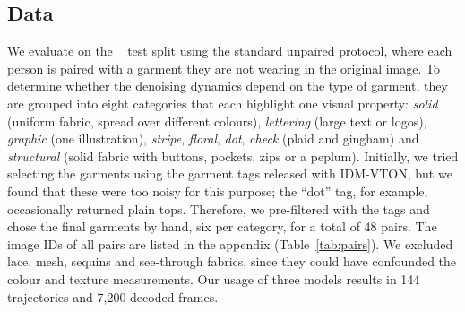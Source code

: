 \begin{table}[h]
\caption{Standard scores on the full \vitonhd test split as reported by \catvton~\cite{chong2025catvton} (Table 1 there; \catvton is its mask-based version, the checkpoint used in this paper). KID as reported. These scores come from the original inference settings of each model, not from our DDIM runs.}
\label{tab:benchmark}
\centering
\small
\setlength{\tabcolsep}{3pt}
\end{table}

\subsection{Data}
We evaluate on the \vitonhd~\cite{choi2021vitonhd} test split using the standard unpaired protocol, where each person is paired with a garment they are not wearing in the original image. To determine whether the denoising dynamics depend on the type of garment, they are grouped into eight categories that each highlight one visual property: \emph{solid} (uniform fabric, spread over different colours), \emph{lettering} (large text or logos), \emph{graphic} (one illustration), \emph{stripe}, \emph{floral}, \emph{dot}, \emph{check} (plaid and gingham) and \emph{structural} (solid fabric with buttons, pockets, zips or a peplum). Initially, we tried selecting the garments using the garment tags released with IDM-VTON, but we found that these were too noisy for this purpose; the ``dot'' tag, for example, occasionally returned plain tops. Therefore, we pre-filtered with the tags and chose the final garments by hand, six per category, for a total of 48 pairs. The image IDs of all pairs are listed in the appendix (Table~\ref{tab:pairs}). We excluded lace, mesh, sequins and see-through fabrics, since they could have confounded the colour and texture measurements. Our usage of three models results in 144 trajectories and 7,200 decoded frames.


